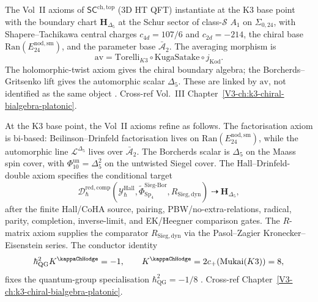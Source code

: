 \begin{remark}
\label{rem:axioms-1}
The Vol~II axioms of $\mathsf{SC}^{\mathrm{ch,top}}$ ($3$D HT QFT)
instantiate at the K3 base point with the boundary chart
$\mathbf H_{\Delta_5}$ at the Schur sector of class-$\mathcal S$ $A_1$
on $\Sigma_{0,24}$, with Shapere--Tachikawa central charges
$c_{4d} = 107/6$ and $c_{2d} = -214$,
the chiral base $\mathrm{Ran}(E^{\mathrm{nod,sm}}_{24})$, and the
parameter base $\bar{\mathcal A}_2$. The averaging morphism is
\[
\mathrm{av}
=\mathrm{Torelli}_{K3}\circ\mathrm{KugaSatake}\circ j_{\mathrm{Kod}}.
\]
The holomorphic-twist axiom gives the chiral boundary algebra; the
Borcherds--Gritsenko lift gives the automorphic scalar
$\Delta_5$. These are linked by $\mathrm{av}$, not identified as
the same object \cite{CostelloHolomorphic,Gaiotto2009}.
Cross-ref Vol.~III Chapter~\ref{V3-ch:k3-chiral-bialgebra-platonic}.
\end{remark}

\begin{remark}
\label{rem:axioms-2}
At the K3 base point, the Vol~II axioms refine as follows. The
factorisation axiom is bi-based: Beilinson--Drinfeld factorisation
lives on $\mathrm{Ran}(E^{\mathrm{nod,sm}}_{24})$, while the
automorphic line $\mathcal L^{\Delta_5}$ lives over
$\bar{\mathcal A}_2$. The Borcherds scalar is
$\Delta_5$ on the Maass spin cover, with
$\Phi_{10}^{\mathrm{un}}=\Delta_5^2$ on the untwisted Siegel
cover. The Hall--Drinfeld-double axiom specifies the conditional
target
\[
\mathcal D_\hbar^{\mathrm{red},\mathrm{comp}}(
  \mathcal Y^{\mathrm{Hall}}_\hbar,
  \widetilde\Phi^{\mathrm{Sieg\text{-}Bor}}_{\mathrm{Sp}_4},
  R_{\mathrm{Sieg,dyn}})
\;\dashrightarrow\;
\mathbf H_{\Delta_5},
\]
after the finite Hall/CoHA source, pairing, PBW/no-extra-relations,
radical, parity, completion, inverse-limit, and EK/Heegner comparison
gates. The $R$-matrix axiom supplies the comparator
$R_{\mathrm{Sieg,dyn}}$ via the Pasol--Zagier
Kronecker--Eisenstein series. The conductor identity
\[
\hbar_{\mathrm{QG}}^2 K^{\kappaChHodge}=-1,\qquad
K^{\kappaChHodge}=2c_+(\mathrm{Mukai}(K3))=8,
\]
fixes the quantum-group specialisation
$\hbar_{\mathrm{QG}}^2=-1/8$ \cite{PasolZagier2013,EtingofKazhdan2007PartV}.
Cross-ref Chapter~\ref{V3-ch:k3-chiral-bialgebra-platonic}.
\end{remark}
